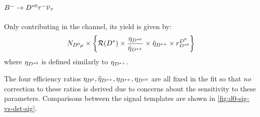 \paragraph{${{{B}^-}} \rightarrow {\ensuremath{{D}^{*0}}}{\ensuremath{\tau^-}}{\ensuremath{{\overline{\nu}}_\tau}}$}
Only contributing in the \Dz channel, its yield is given by:
\begin{equation}
    N_{{{D}^0}{\mu}} \times \left\{
        \mathcal{R}(D^{*}) \times \frac{\eta_{{{D}^{*0}}}}{\tilde{\eta}_{{{D}^{*+}}}} \times \tilde{\eta}_{{{D}^{*+}}} \times r_{{{D}^{*0}}}^\text{{\ensuremath{{D}^0}}}
    \right\}
\end{equation}
where $\eta_{{{D}^{*0}}}$ is defined similarly to $\eta_{{{D}^{*+}}}$.

The four efficiency ratios
$\eta_{{{D}^0}}, \tilde{\eta}_{{{D}^{*+}}}, \eta_{{{D}^{*+}}}, \eta_{{{D}^{*0}}}$
are all fixed in the fit so that \emph{no} correction to these ratios is
derived due to concerns about the sensitivity to these parameters.
Comparisons between the signal templates are shown in
\cref{fig:d0-sig-vs-dst-sig}.

